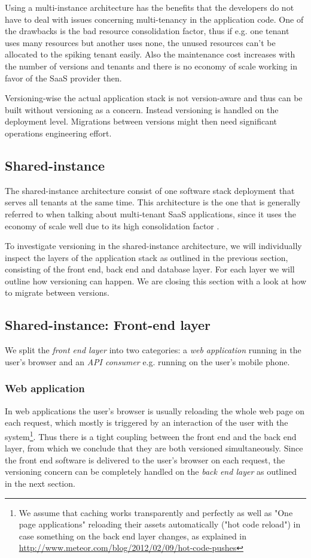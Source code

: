 Using a multi-instance architecture has the benefits that the developers do not have to deal with issues concerning multi-tenancy in the application code. One of the drawbacks is the bad resource consolidation factor, thus if e.g. one tenant uses many resources but another uses none, the unused resources can't be allocated to the spiking tenant easily. Also the maintenance cost increases with the number of versions and tenants and there is no economy of scale working in favor of the SaaS provider then.

Versioning-wise the actual application stack is not version-aware and thus can be built without versioning as a concern. Instead versioning is handled on the deployment level. Migrations between versions might then need significant operations engineering effort.

\subsection{Shared-instance}

The shared-instance architecture consist of one software stack deployment that serves all tenants at the same time. This architecture is the one that is generally referred to when talking about multi-tenant SaaS applications, since it uses the economy of scale well due to its high consolidation factor \cite{Mietzner2009} \cite{Bezemer2010} \cite{Chong2006}.

To investigate versioning in the shared-instance architecture, we will individually inspect the layers of the application stack as outlined in the previous section, consisting of the front end, back end and database layer. For each layer we will outline how versioning can happen. We are closing this section with a look at how to migrate between versions.

\subsection{Shared-instance: Front-end layer}
\label{sec:sharedfrontend}

We split the \emph{front end layer} into two categories: a \emph{web application} running in the user's browser and an \emph{API consumer} e.g. running on the user's mobile phone.

\subsubsection{Web application} In web applications the user's browser is usually reloading the whole web page on each request, which mostly is triggered by an interaction of the user with the system\footnote{We assume that caching works transparently and perfectly as well as "One page applications" reloading their assets automatically ("hot code reload") in case something on the back end layer changes, as explained in \url{http://www.meteor.com/blog/2012/02/09/hot-code-pushes}}. Thus there is a tight coupling between the front end and the back end layer, from which we conclude that they are both versioned simultaneously. Since the front end software is delivered to the user's browser on each request, the versioning concern can be completely handled on the \emph{back end layer} as outlined in the next section.


